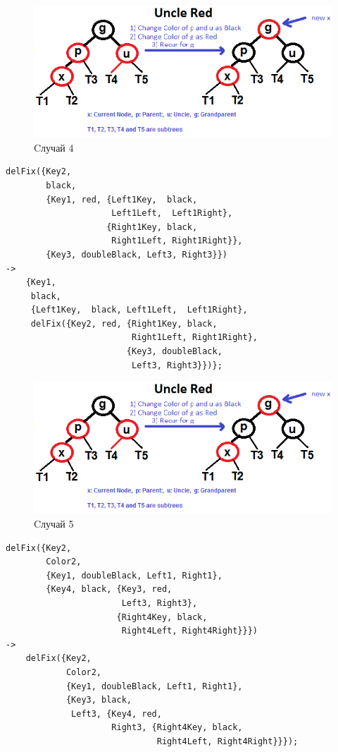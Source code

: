 			\begin{figure}[H]
				\centering
				\includegraphics[width=\textwidth]{img/tan-aus.png}
				\caption{Cлучай 4}
			\end{figure}
			\begin{lstlisting}
delFix({Key2,																		
        black,																		
        {Key1, red, {Left1Key,  black, 
                     Left1Left,  Left1Right},						
                    {Right1Key, black, 
                     Right1Left, Right1Right}},					
        {Key3, doubleBlack, Left3, Right3}})																			
->																					
    {Key1,																			
     black,																										
     {Left1Key,  black, Left1Left,  Left1Right},									
     delFix({Key2, red, {Right1Key, black, 
                         Right1Left, Right1Right},			
 					    {Key3, doubleBlack, 
 					     Left3, Right3}})};																				
			\end{lstlisting}
			
			\begin{figure}[H]
				\centering
				\includegraphics[width=\textwidth]{img/tan-aus.png}
				\caption{Cлучай 5}
			\end{figure}
			\begin{lstlisting}
delFix({Key2,																		
        Color2,																		
        {Key1, doubleBlack, Left1, Right1},											
        {Key4, black, {Key3, red, 
                       Left3, Right3}, 									
                      {Right4Key, black, 
                       Right4Left, Right4Right}}})																			
->																					
    delFix({Key2,																	
            Color2,																	
            {Key1, doubleBlack, Left1, Right1},										
            {Key3, black, 
             Left3, {Key4, red, 
                     Right3, {Right4Key, black, 
                              Right4Left, Right4Right}}});																				
			\end{lstlisting}
			
